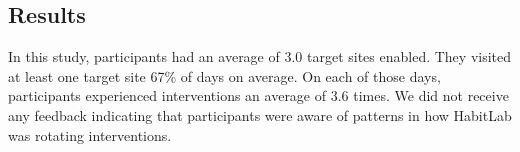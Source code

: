 \subsection{Results}

In this study, participants had an average of 3.0 target sites enabled. They visited at least one target site 67\% of days on average. On each of those days, participants experienced interventions an average of 3.6 times. We did not receive any feedback indicating that participants were aware of patterns in how HabitLab was rotating interventions.









